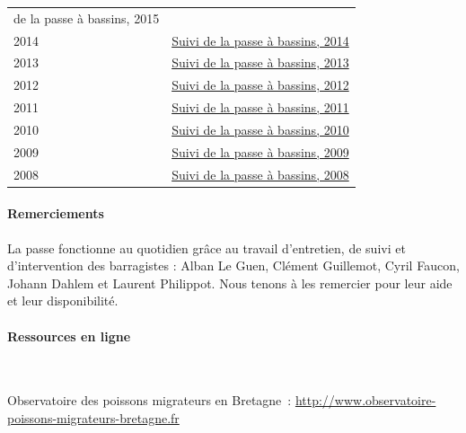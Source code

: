 \documentclass[11pt,twocolumn,titlepage,twoside]{article}\usepackage[]{graphicx}\usepackage[]{xcolor}
\begin{document}
\begin{table}[htbp]
\begin{tabular}{lp{7cm}}
{de la passe à bassins, 2015}\\
2014 &
\href{https://eptbvilaine56.sharepoint.com/:b:/g/extranet/EQCdJUAzgLlJpqe-HgXcbn4BvTlV7Xool5zCmmV-fZaolg?e=dvEObL}{Suivi
de la passe à bassins, 2014}\\
2013 &
\href{https://eptbvilaine56.sharepoint.com/:b:/g/extranet/Effnw5jtEPFHmxCcqlWiTBsB0Cm29yADN5bSREbOi1yTzA?e=YS1Ref}{Suivi
de la passe à bassins, 2013}\\
2012 &
\href{https://eptbvilaine56.sharepoint.com/:b:/g/extranet/Ed6J-KFKTc1EhcXyxox1eU4B86i9IYhY53FuP2ilW9TdhA?e=pagXSD}{Suivi
de la passe à bassins, 2012}\\
2011 &
\href{https://eptbvilaine56.sharepoint.com/:b:/g/extranet/EWQJkGynJO9FkLtMc0evglwBhVC3k2ORqwqhA_ez-fecKQ?e=xaK6zo}{Suivi
de la passe à bassins, 2011}\\
2010 &
\href{https://eptbvilaine56.sharepoint.com/:b:/g/extranet/ETcl4LTYbb5FqGalUwApPucBFInwPrGUdBV20pmuPfhkog?e=cfSoKj}{Suivi
de la passe à bassins, 2010}\\
2009 &
\href{https://eptbvilaine56.sharepoint.com/:b:/g/extranet/ETTqqTILtm5OjioHyGGAsooBsGVP5CgR9fE-xCj-evifLA?e=2I4CbN}{Suivi
de la passe à bassins, 2009}\\
2008 &
\href{https://eptbvilaine56.sharepoint.com/:b:/g/extranet/ESOYjucqRlRNm4hXNuO3-EgBBOTq0zMqmhq0u125J21Yxw?e=EbCzao}{Suivi
de la passe à bassins, 2008}\\
%
\bottomrule
\end{tabular}
\label{table_references}
\end{table}

\bigskip
\paragraph{Remerciements}

La passe fonctionne au quotidien grâce au travail d'entretien, de suivi et
d'intervention des barragistes : Alban Le Guen, Clément Guillemot, Cyril Faucon,
Johann Dahlem et Laurent Philippot. Nous tenons à les remercier pour leur aide
et leur disponibilité.
\bigskip

\vfill
\paragraph{Ressources en ligne} ~

Observatoire des poissons migrateurs en Bretagne~:
\href{http://www.observatoire-poissons-migrateurs-bretagne.fr}{{http://www.observatoire-poissons-migrateurs-bretagne.fr}}
\end{document}
